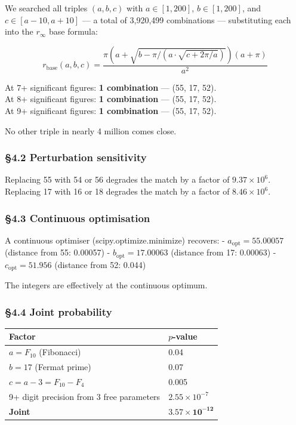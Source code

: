 \documentclass[
  11pt,
  a4paper]{article}
\begin{document}
We searched all triples \((a, b, c)\) with \(a \in [1, 200]\),
\(b \in [1, 200]\), and \(c \in [a-10, a+10]\) --- a total of 3,920,499
combinations --- substituting each into the \(r_\infty\) base formula:

\[r_\text{base}(a, b, c) = \frac{\pi\left(a + \sqrt{b - \pi/(a \cdot \sqrt{c + 2\pi/a})}\right)(a + \pi)}{a^2}\]

At 7+ significant figures: \textbf{1 combination} --- (55, 17, 52).\\
At 8+ significant figures: \textbf{1 combination} --- (55, 17, 52).\\
At 9+ significant figures: \textbf{1 combination} --- (55, 17, 52).

No other triple in nearly 4 million comes close.

\subsubsection{§4.2 Perturbation
sensitivity}\label{perturbation-sensitivity}

Replacing 55 with 54 or 56 degrades the match by a factor of
\(9.37 \times 10^6\).\\
Replacing 17 with 16 or 18 degrades the match by a factor of
\(8.46 \times 10^6\).

\subsubsection{§4.3 Continuous
optimisation}\label{continuous-optimisation}

A continuous optimiser (scipy.optimize.minimize) recovers: -
\(a_\text{opt} = 55.00057\) (distance from 55: 0.00057) -
\(b_\text{opt} = 17.00063\) (distance from 17: 0.00063) -
\(c_\text{opt} = 51.956\) (distance from 52: 0.044)

The integers are effectively at the continuous optimum.

\subsubsection{§4.4 Joint probability}\label{joint-probability}

\begin{longtable}[]{@{}ll@{}}
\toprule\noalign{}
Factor & \(p\)-value \\
\midrule\noalign{}
\endhead
\bottomrule\noalign{}
\endlastfoot
\(a = F_{10}\) (Fibonacci) & 0.04 \\
\(b = 17\) (Fermat prime) & 0.07 \\
\(c = a - 3 = F_{10} - F_4\) & 0.005 \\
9+ digit precision from 3 free parameters & \(2.55 \times 10^{-7}\) \\
\textbf{Joint} & \(\mathbf{3.57 \times 10^{-12}}\) \\
\end{longtable}
\end{document}
